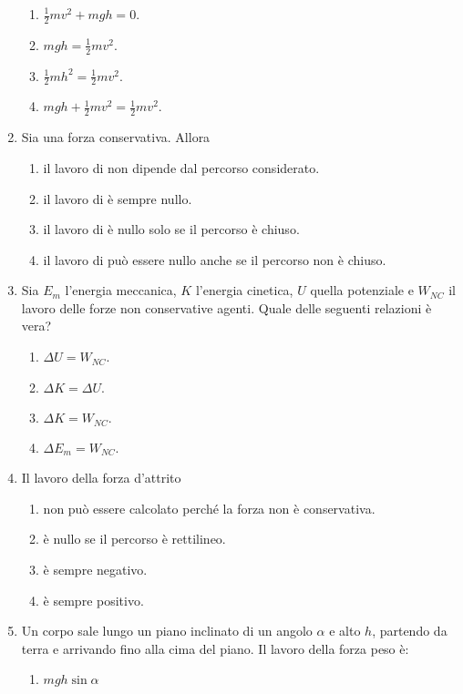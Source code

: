 \documentclass{article}
\begin{document}
\begin{enumerate}
  \begin{enumerate}[label=\Alph*.]
    \item $\frac{1}{2}mv^2+mgh=0.$
    \item $mgh=\frac{1}{2}mv^2$.
    \item $\frac{1}{2}mh^2=\frac{1}{2}mv^2$.
    \item $mgh+\frac{1}{2}mv^2=\frac{1}{2}mv^2.$
  \end{enumerate}
  \item Sia  una forza conservativa. Allora
  \begin{enumerate}[label=\Alph*.]
    \item il lavoro di  non dipende dal percorso considerato.
    \item il lavoro di  è sempre nullo.
    \item il lavoro di  è nullo solo se il percorso è chiuso.
    \item il lavoro di  può essere nullo anche se il percorso non è chiuso.
  \end{enumerate}
  \item Sia $E_m$ l'energia meccanica, $K$ l'energia cinetica, $U$ quella potenziale e $W_{NC}$ il lavoro delle forze non conservative agenti. Quale delle seguenti relazioni è vera?
  \begin{enumerate}[label=\Alph*.]
    \item $\Delta U=W_{NC}$.
    \item $\Delta K = \Delta U$.
    \item $\Delta K=W_{NC}.$
    \item $\Delta E_m=W_{NC}$.
  \end{enumerate}
  \item Il lavoro della forza d'attrito
  \begin{enumerate}[label=\Alph*.]
    \item non può essere calcolato perché la forza non è conservativa.
    \item è nullo se il percorso è rettilineo.
    \item è sempre negativo.
    \item è sempre positivo.
  \end{enumerate}
  \item Un corpo sale lungo un piano inclinato di un angolo $\alpha$ e alto $h$, partendo da terra e arrivando fino alla cima del piano. Il lavoro della forza peso è:
  \begin{enumerate}[label=\Alph*.]
    \item $mgh\sin\alpha$

\end{enumerate}
\end{enumerate}
\end{document}
